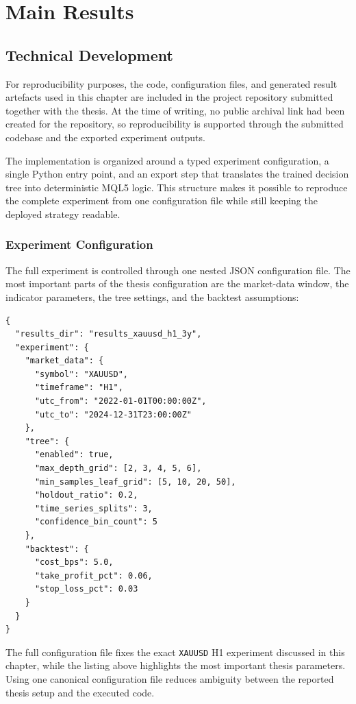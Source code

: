 \chapter{Main Results}
\label{chapter:MainResults}

\section{Technical Development}

For reproducibility purposes, the code, configuration files, and generated
result artefacts used in this chapter are included in the project repository
submitted together with the thesis. At the time of writing, no public archival
link had been created for the repository, so reproducibility is supported
through the submitted codebase and the exported experiment outputs.

The implementation is organized around a typed experiment configuration, a
single Python entry point, and an export step that translates the trained
decision tree into deterministic MQL5 logic. This structure makes it possible
to reproduce the complete experiment from one configuration file while still
keeping the deployed strategy readable.

\subsection{Experiment Configuration}

The full experiment is controlled through one nested JSON configuration file.
The most important parts of the thesis configuration are the market-data
window, the indicator parameters, the tree settings, and the backtest
assumptions:

\begin{lstlisting}[language={},caption={Simplified thesis configuration for the XAUUSD H1 experiment.}]
{
  "results_dir": "results_xauusd_h1_3y",
  "experiment": {
    "market_data": {
      "symbol": "XAUUSD",
      "timeframe": "H1",
      "utc_from": "2022-01-01T00:00:00Z",
      "utc_to": "2024-12-31T23:00:00Z"
    },
    "tree": {
      "enabled": true,
      "max_depth_grid": [2, 3, 4, 5, 6],
      "min_samples_leaf_grid": [5, 10, 20, 50],
      "holdout_ratio": 0.2,
      "time_series_splits": 3,
      "confidence_bin_count": 5
    },
    "backtest": {
      "cost_bps": 5.0,
      "take_profit_pct": 0.06,
      "stop_loss_pct": 0.03
    }
  }
}
\end{lstlisting}

The full configuration file fixes the exact \texttt{XAUUSD} H1 experiment
discussed in this chapter, while the listing above highlights the most
important thesis parameters. Using one canonical configuration file reduces
ambiguity between the reported thesis setup and the executed code.

